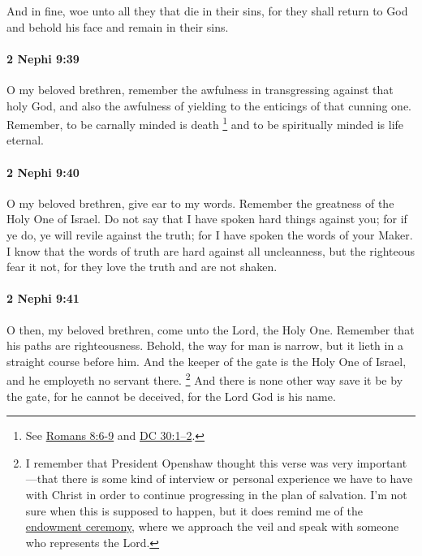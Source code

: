 			And in fine, woe unto all they that die in their sins,
			for they shall return to God and behold his face and remain in their sins.

		\paragraph{2 Nephi 9:39} %
			\label{2NEPHI-9-39}

			O my beloved brethren,
			remember the awfulness in transgressing against that holy God,
			and also the awfulness of yielding to the enticings of that cunning one.
			Remember, to be carnally minded is death%
				\footnote{%
					\label{2NEPHI-9-39-carnally}%
					See \hyperref[ROMANS-8-6]{Romans 8:6-9} and \hyperref[DC30-1]{DC 30:1--2}.
					}
			and to be spiritually minded is life eternal.

		\paragraph{2 Nephi 9:40} %
			\label{2NEPHI-9-40}

			O my beloved brethren, give ear to my words.
			Remember the greatness of the Holy One of Israel.
			Do not say that I have spoken hard things against you;
			for if ye do, ye will revile against the truth;
			for I have spoken the words of your Maker.
			I know that the words of truth are hard against all uncleanness,
			but the righteous fear it not,
			for they love the truth and are not shaken.

		\paragraph{2 Nephi 9:41} %
			\label{2NEPHI-9-41}

			O then, my beloved brethren, come unto the Lord, the Holy One.
			Remember that his paths are righteousness.
			Behold, the way for man is narrow,
			but it lieth in a straight course before him.
			And the keeper of the gate is the Holy One of Israel,
			and he employeth no servant there.%
				\footnote{%
					\label{2NEPHI-9-41-keeper}%
					I remember that President Openshaw thought this verse was very important---that there is some kind of interview or personal experience we have to have with Christ in order to continue progressing in the plan of salvation. I'm not sure when this is supposed to happen, but it does remind me of the \hyperref[ENDOWMENT-lord]{endowment ceremony}, where we approach the veil and speak with someone who represents the Lord.
					}
			And there is none other way save it be by the gate,
			for he cannot be deceived,
			for the Lord God is his name.

